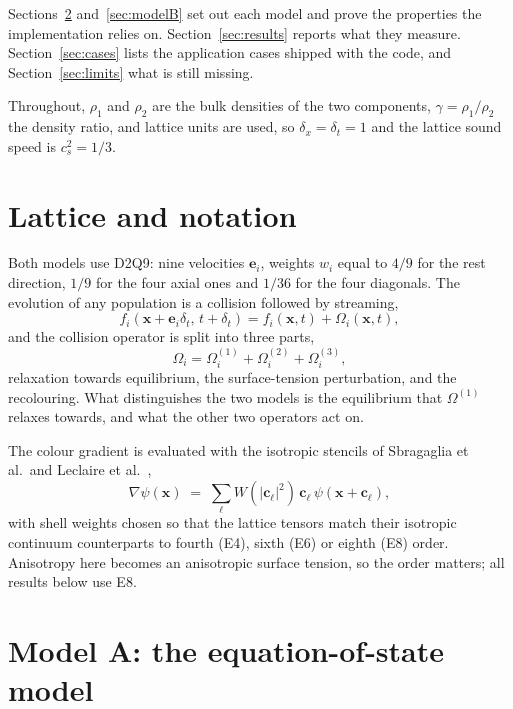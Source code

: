 \documentclass[11pt,a4paper]{article}
\theoremstyle{plain}
\theoremstyle{definition}
\newcommand{\ee}{\mathbf{e}}
\newcommand{\xx}{\mathbf{x}}
\newcommand{\cs}{c_s}
\begin{document}
Sections~\ref{sec:modelA} and~\ref{sec:modelB} set out each model and prove the
properties the implementation relies on. Section~\ref{sec:results} reports what
they measure. Section~\ref{sec:cases} lists the application cases shipped with
the code, and Section~\ref{sec:limits} what is still missing.

Throughout, $\rho_1$ and $\rho_2$ are the bulk densities of the two components,
$\gamma = \rho_1/\rho_2$ the density ratio, and lattice units are used, so
$\delta_x = \delta_t = 1$ and the lattice sound speed is $\cs^2 = 1/3$.

\section{Lattice and notation}

Both models use D2Q9: nine velocities $\ee_i$, weights $w_i$ equal to $4/9$ for
the rest direction, $1/9$ for the four axial ones and $1/36$ for the four
diagonals. The evolution of any population is a collision followed by streaming,
\begin{equation}
  f_i(\xx + \ee_i \delta_t,\, t + \delta_t) = f_i(\xx, t) + \Omega_i(\xx, t),
  \label{eq:lbe}
\end{equation}
and the collision operator is split into three parts,
\begin{equation}
  \Omega_i = \Omega_i^{(1)} + \Omega_i^{(2)} + \Omega_i^{(3)},
  \label{eq:split}
\end{equation}
relaxation towards equilibrium, the surface-tension perturbation, and the
recolouring. What distinguishes the two models is the equilibrium that
$\Omega^{(1)}$ relaxes towards, and what the other two operators act on.

The colour gradient is evaluated with the isotropic stencils of Sbragaglia et
al.\ and Leclaire et al.~\cite{leclaire2011},
\begin{equation}
  \nabla \psi(\xx) \;=\; \sum_\ell W(|\mathbf{c}_\ell|^2)\, \mathbf{c}_\ell\,
  \psi(\xx + \mathbf{c}_\ell),
  \label{eq:isogradient}
\end{equation}
with shell weights chosen so that the lattice tensors match their isotropic
continuum counterparts to fourth (E4), sixth (E6) or eighth (E8) order.
Anisotropy here becomes an anisotropic surface tension, so the order matters;
all results below use E8.

\section{Model A: the equation-of-state model}
\label{sec:modelA}
\end{document}
